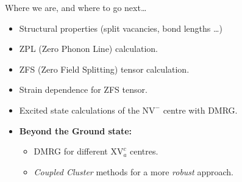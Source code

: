 
\begin{frame}{Where we are, and where to go next\ldots} %
  \begin{itemize}
    \item
      Structural properties (split vacancies, bond lengths \ldots)
    \item
      ZPL (Zero Phonon Line) calculation.
    \item
      ZFS (Zero Field Splitting) tensor calculation.
    \item
      Strain dependence for ZFS tensor.
    \item
      Excited state calculations of the $ \mathrm{NV}^{-} $ centre with DMRG\@.
    \item
      \textbf{Beyond the Ground state:}\\
      \begin{itemize}
        \item DMRG for different $ \mathrm{XV}^{c}_{a} $ centres.
        \item \textit{Coupled Cluster} methods for a more \textit{robust} approach.
      \end{itemize}
  \end{itemize}
\end{frame}
